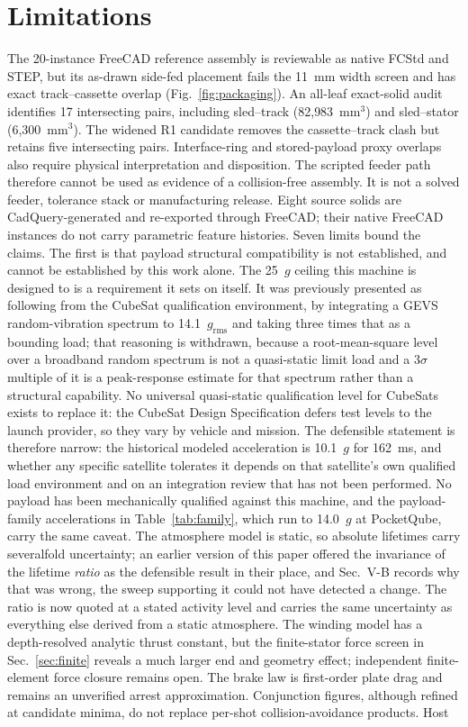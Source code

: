 \documentclass[conference]{IEEEtran}
\begin{document}
\section{Limitations}\label{sec:lim}
The 20-instance FreeCAD reference assembly is reviewable as native FCStd and STEP, but its as-drawn side-fed placement fails the 11~mm width screen and has exact track--cassette overlap (Fig.~\ref{fig:packaging}). An all-leaf exact-solid audit identifies 17 intersecting pairs, including sled--track (82{,}983~mm$^3$) and sled--stator (6{,}300~mm$^3$). The widened R1 candidate removes the cassette--track clash but retains five intersecting pairs. Interface-ring and stored-payload proxy overlaps also require physical interpretation and disposition. The scripted feeder path therefore cannot be used as evidence of a collision-free assembly. It is not a solved feeder, tolerance stack or manufacturing release. Eight source solids are CadQuery-generated and re-exported through FreeCAD; their native FreeCAD instances do not carry parametric feature histories. Seven limits bound the claims. The first is that payload structural compatibility is not established, and cannot be established by this work alone. The 25~$g$ ceiling this machine is designed to is a requirement it sets on itself. It was previously presented as following from the CubeSat qualification environment, by integrating a GEVS random-vibration spectrum to 14.1~$g_{\mathrm{rms}}$ and taking three times that as a bounding load; that reasoning is withdrawn, because a root-mean-square level over a broadband random spectrum is not a quasi-static limit load and a $3\sigma$ multiple of it is a peak-response estimate for that spectrum rather than a structural capability. No universal quasi-static qualification level for CubeSats exists to replace it: the CubeSat Design Specification \cite{cds} defers test levels to the launch provider, so they vary by vehicle and mission. The defensible statement is therefore narrow: the historical modeled acceleration is 10.1~$g$ for 162~ms, and whether any specific satellite tolerates it depends on that satellite's own qualified load environment and on an integration review that has not been performed. No payload has been mechanically qualified against this machine, and the payload-family accelerations in Table~\ref{tab:family}, which run to 14.0~$g$ at PocketQube, carry the same caveat. The atmosphere model is static, so absolute lifetimes carry severalfold uncertainty; an earlier version of this paper offered the invariance of the lifetime \emph{ratio} as the defensible result in their place, and Sec.~V-B records why that was wrong, the sweep supporting it could not have detected a change. The ratio is now quoted at a stated activity level and carries the same uncertainty as everything else derived from a static atmosphere. The winding model has a depth-resolved analytic thrust constant, but the finite-stator force screen in Sec.~\ref{sec:finite} reveals a much larger end and geometry effect; independent finite-element force closure remains open. The brake law is first-order plate drag and remains an unverified arrest approximation. Conjunction figures, although refined at candidate minima, do not replace per-shot collision-avoidance products. Host 
\end{document}
